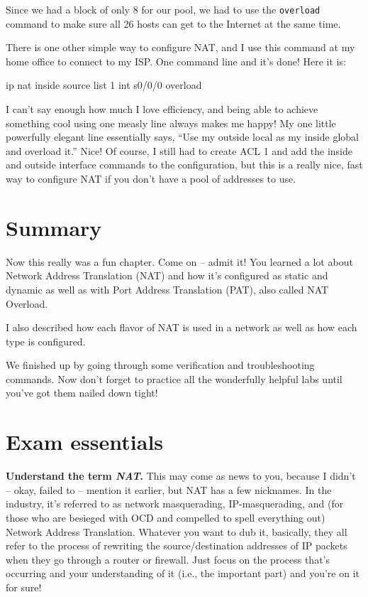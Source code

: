 Since we had a block of only 8 for our pool, we had to use the
\texttt{overload} command to make sure all 26 hosts can get to the
Internet at the same time.

There is one other simple way to configure NAT, and I use this command
at my home office to connect to my ISP. One command line and it's done!
Here it is:

\begin{cli}
ip nat inside source list 1 int s0/0/0 overload
\end{cli}

I can't say enough how much I love efficiency, and being able to achieve
something cool using one measly line always makes me happy! My one
little powerfully elegant line essentially says, ``Use my outside local
as my inside global and overload it.'' Nice! Of course, I still had to
create ACL 1 and add the inside and outside interface commands to the
configuration, but this is a really nice, fast way to configure NAT if
you don't have a pool of addresses to use.



\section{Summary}

Now this really was a fun chapter. Come on -- admit it! You learned a lot
about Network Address Translation (NAT) and how it's configured as
static and dynamic as well as with Port Address Translation (PAT), also
called NAT Overload.

I also described how each flavor of NAT is used in a network as well as
how each type is configured.

We finished up by going through some verification and troubleshooting
commands. Now don't forget to practice all the wonderfully helpful labs
until you've got them nailed down tight!



\section{Exam essentials}

\textbf{Understand the term \emph{NAT}.} This may come as news to you,
because I didn't -- okay, failed to -- mention it earlier, but NAT has a
few nicknames. In the industry, it's referred to as network
masquerading, IP-masquerading, and (for those who are besieged with OCD
and compelled to spell everything out) Network Address Translation.
Whatever you want to dub it, basically, they all refer to the process of
rewriting the source/destination addresses of IP packets when they go
through a router or firewall. Just focus on the process that's occurring
and your understanding of it (i.e., the important part) and you're on it
for sure!

